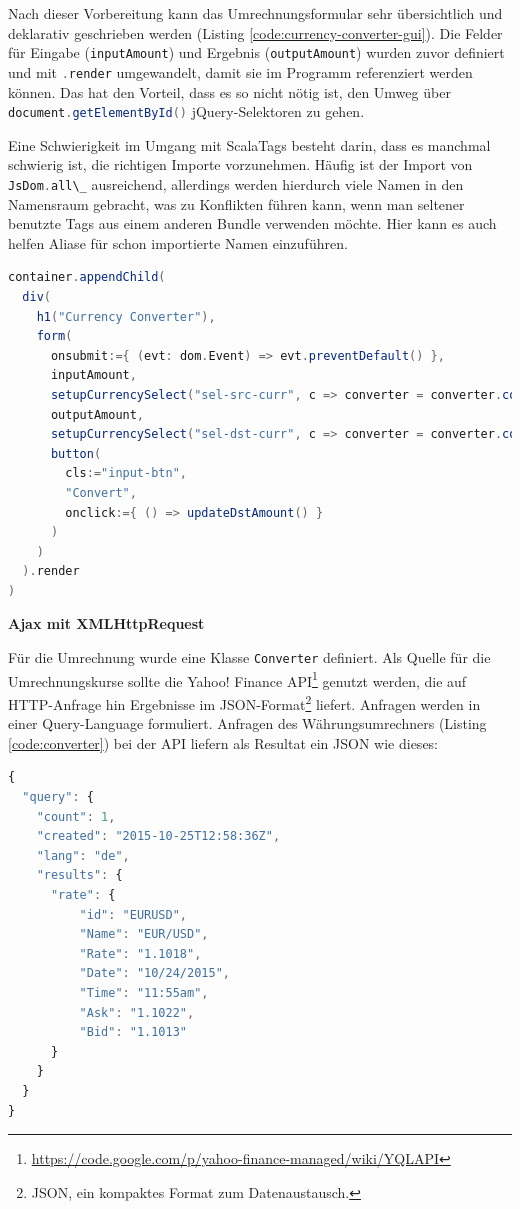 \documentclass[a4paper, 12pt, hidelinks, listof=totoc, listoftables=totoc, bibliography=totoc]{scrreprt}
\newcommand{\scala}[1]{\lstinline[language=Scala, style=inline]|#1|}
\newcommand{\MyMiniSec}[1]{\rmfamily\fontsize{12}{15}\selectfont
	\vspace{7pt}\textbf{#1} %
}
\begin{document}
Nach dieser Vorbereitung kann das Umrechnungsformular sehr übersichtlich und deklarativ geschrieben werden (Listing \ref{code:currency-converter-gui}). Die Felder für Eingabe (\scala{inputAmount}) und Ergebnis (\scala{outputAmount}) wurden zuvor definiert und mit \scala{.render} umgewandelt, damit sie im Programm referenziert werden können. Das hat den Vorteil, dass es so nicht nötig ist, den Umweg über \scala{document.getElementById()} jQuery-Selektoren zu gehen.

Eine Schwierigkeit im Umgang mit ScalaTags besteht darin, dass es manchmal schwierig ist, die richtigen Importe vorzunehmen. Häufig ist der Import von \scala{JsDom.all\_} ausreichend, allerdings werden hierdurch viele Namen in den Namensraum gebracht, was zu Konflikten führen kann, wenn man seltener benutzte Tags aus einem anderen Bundle verwenden möchte. Hier kann es auch helfen Aliase für schon importierte Namen einzuführen.

\begin{lstlisting}[language=Scala, caption={Deklaration eines Formulars zur Währungsumrechnung mit ScalaTags.}, label={code:currency-converter-gui}]
container.appendChild(
  div(
    h1("Currency Converter"),
    form(
      onsubmit:={ (evt: dom.Event) => evt.preventDefault() },
      inputAmount,
      setupCurrencySelect("sel-src-curr", c => converter = converter.copy(srcCurr = c)),
      outputAmount,
      setupCurrencySelect("sel-dst-curr", c => converter = converter.copy(dstCurr = c)),
      button(
        cls:="input-btn",
        "Convert",
        onclick:={ () => updateDstAmount() }
      )
    )
  ).render
)
\end{lstlisting}


\MyMiniSec{Ajax mit XMLHttpRequest}

Für die Umrechnung wurde eine Klasse \scala{Converter} definiert. Als Quelle für die Umrechnungskurse sollte die Yahoo! Finance \ac{API}\footnote{\url{https://code.google.com/p/yahoo-finance-managed/wiki/YQLAPI}} genutzt werden, die auf \ac{HTTP}-Anfrage hin Ergebnisse im JSON-Format\footnote{\ac{JSON}, ein kompaktes Format zum Datenaustausch.} liefert. Anfragen werden in einer Query-Language formuliert. Anfragen des Währungsumrechners (Listing \ref{code:converter}) bei der \ac{API} liefern als Resultat ein \ac{JSON} wie dieses:

\begin{lstlisting}[language=JavaScript, style=snippet]
{
  "query": {
    "count": 1,
    "created": "2015-10-25T12:58:36Z",
    "lang": "de",
    "results": {
      "rate": {
          "id": "EURUSD",
          "Name": "EUR/USD",
          "Rate": "1.1018",
          "Date": "10/24/2015",
          "Time": "11:55am",
          "Ask": "1.1022",
          "Bid": "1.1013"
      }
    }
  }
}
\end{lstlisting}
\end{document}
